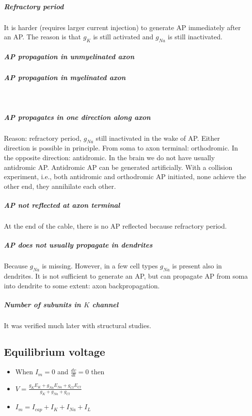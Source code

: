 \documentclass[main]{subfiles}
\begin{document}
\subparagraph{Refractory period}
It is harder (requires larger current injection) to generate AP immediately after an AP. The reason is that $g_K$ is still activated and $g_{Na}$ is still inactivated.

\subparagraph{AP propagation in unmyelinated axon}

\subparagraph{AP propagation in myelinated axon}
\\
\subparagraph{AP propagates in one direction along axon}
Reason: refractory period, $g_{Na}$ still inactivated  in the wake of AP. Either direction is possible in principle. From soma to axon terminal: orthodromic. In the opposite direction: antidromic. In the brain we do not have usually antidromic AP.
Antidromic AP can be generated artificially. With a collision experiment, i.e., both antidromic and orthodromic AP initiated, none achieve the other end, they annihilate each other.

\subparagraph{AP not reflected at axon terminal}
At the end of the cable, there is no AP reflected because refractory period.

\subparagraph{AP does not usually propagate in dendrites}
Because $g_{Na}$ is missing. However, in a few cell types $g_{Na}$ is present also in dendrites. It is not sufficient to generate an AP, but can propagate AP from soma into dendrite to some extent: axon backpropagation.

\subparagraph{Number of subunits in $K$ channel}
It was verified much later with structural studies.





\subsection{Equilibrium voltage}
\begin{itemize}[noitemsep,nolistsep]
	\item When $I_m = 0$ and $\frac{dv}{dt}=0$ then
	\item $V=\frac{g_KE_K+g_{Na}E_{Na}+g_{Cl}E_{Cl}}{g_K+g_{Na}+g_{Cl}}$
	\item $I_m = I_{cap}+I_K+I_{Na}+I_{L}$
\end{itemize}
\end{document}
